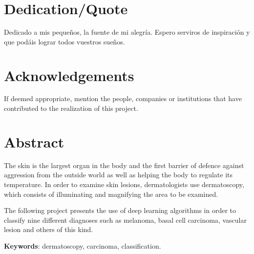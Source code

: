 \chapter*{Dedication/Quote}

Dedicado a mis pequeños, la fuente de mi alegría. Espero serviros de inspiración y que podáis lograr todos vuestros sueños. 

\chapter*{Acknowledgements}

If deemed appropriate, mention the people, companies or institutions that have contributed to the realization of this project.

\chapter*{Abstract}

\onehalfspacing

The skin is the largest organ in the body and the first barrier of defence against aggression from the outside world as well as helping the body to regulate its temperature. In order to examine skin lesions, dermatologists use dermatoscopy, which consists of illuminating and magnifying the area to be examined. 

The following project presents the use of deep learning algorithms in order to classify nine different diagnoses such as melanoma, basal cell carcinoma, vascular lesion and others of this kind.



\vspace{1.5cm}

\textbf{Keywords}: dermatoscopy, carcinoma, classification.
